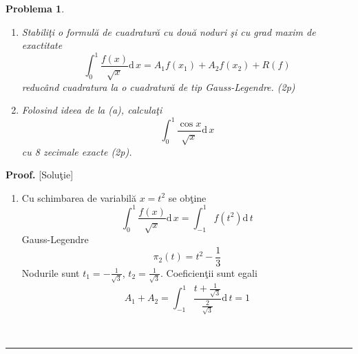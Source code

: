 \documentclass[12pt]{article}%
\newtheorem{problem}[theorem]{Problema}
\newenvironment{proof}[1][Proof]{\noindent\textbf{#1.} }{\ \rule{0.5em}{0.5em}}
\begin{document}
\begin{problem}


\begin{enumerate}
\item[(a)] Stabili\c{t}i o formul\u{a} de cuadratur\u{a} cu dou\u{a} noduri
\c{s}i cu grad maxim de exactitate
\[
\int_{0}^{1}\frac{f(x)}{\sqrt{x}}\mathrm{d}\,x=A_{1}f(x_{1})+A_{2}%
f(x_{2})+R(f)
\]
reduc\^{a}nd cuadratura la o cuadratur\u{a} de tip Gauss-Legendre. (2p)

\item[(b)] Folosind ideea de la (a), calcula\c{t}i
\[
\int_{0}^{1}\frac{\cos x}{\sqrt{x}}\mathrm{d}\,x
\]
cu 8 zecimale exacte (2p).
\end{enumerate}
\end{problem}

\begin{proof}
[Solu\c{t}ie]

\begin{enumerate}
\item[(a)] Cu schimbarea de variabil\u{a} $x=t^{2}$ se ob\c{t}ine
\[
\int_{0}^{1}\frac{f(x)}{\sqrt{x}}\mathrm{d}\,x=\int_{-1}^{1}f(t^{2}%
)\mathrm{d}\,t
\]
Gauss-Legendre%
\[
\pi_{2}(t)=t^{2}-\frac{1}{3}%
\]
Nodurile sunt $t_{1}=-\frac{1}{\sqrt{3}}$, $t_{2}=\frac{1}{\sqrt{3}}$.
Coeficien\c{t}ii sunt egali%
\[
A_{1}+A_{2}=\int_{-1}^{1}\frac{t+\frac{1}{\sqrt{3}}}{\frac{2}{\sqrt{3}}%
}\mathrm{d}\,t=1
\]

\end{enumerate}
\end{proof}
\end{document}
